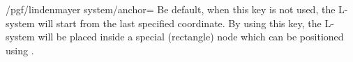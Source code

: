 \begin{key}{/pgf/lindenmayer system/anchor=}
  Be default, when this key is not used, the L-system will start from 
  the last specified coordinate. By using this key, the L-system
  will be placed inside a special (rectangle) node which can be
	positioned using .

\begin{codeexample}[]
\end{codeexample} 
\end{key}
